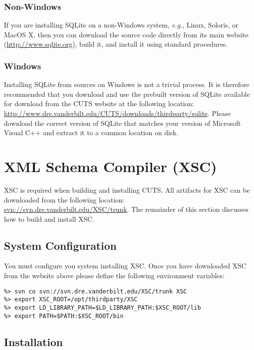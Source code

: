 \subsubsection{Non-Windows}
 
If you are installing SQLite on a non-Windows system, \textit{e.g.}, Linux, 
Soloris, or MacOS X, then you can download the source code directly from its
main website (\url{http://www.sqlite.org}), build it, and install it using  
standard procedures.

\subsubsection{Windows}

Installing SQLite from sources on Windows is not a trivial process. 
It is therefore recommended that you download and use the prebuilt 
version of SQLite available for download from the CUTS website at the 
following location:
\url{http://www.dre.vanderbilt.edu/CUTS/downloads/thirdparty/sqlite}. Please download
the correct version of SQLite that matches your version of Microsoft Visual
C++ and extract it to a common location on disk.

\section{XML Schema Compiler (XSC)}
\label{sec:thirdparty-xsc}

XSC is required when building and installing CUTS. All artifacts
for XSC can be downloaded from the following location: 
\url{svn://svn.dre.vanderbilt.edu/XSC/trunk}. The remainder of this section
discusses how to build and install XSC.

\subsection{System Configuration}

You must configure you system installing XSC. Once you have downloaded 
XSC from the website above please define the following environment variables:
\begin{lstlisting}
%> svn co svn://svn.dre.vanderbilt.edu/XSC/trunk XSC
%> export XSC_ROOT=/opt/thirdparty/XSC
%> export LD_LIBRARY_PATH=$LD_LIBRARY_PATH:$XSC_ROOT/lib
%> export PATH=$PATH:$XSC_ROOT/bin
\end{lstlisting}

\subsection{Installation}

